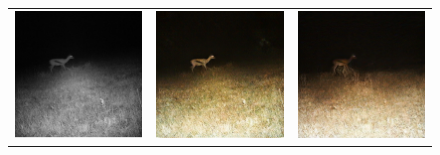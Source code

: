 \documentclass[a4paper,11pt, DIV=12]{scrartcl}
\begin{document}
\begin{figure}[ht]
\begin{tabularx}{.69\textwidth}{>{\centering\arraybackslash}X >{\centering\arraybackslash}X >{\centering\arraybackslash}X}
      \includegraphics{S2_B07_R1_PICT3274_real.png} & \includegraphics{S2_B07_R1_PICT3274_cyclegan.png} & \includegraphics{S2_B07_R1_PICT3274_cut.png} \\

\end{tabularx}
\end{figure}
\end{document}
